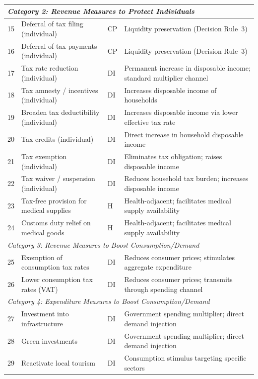 \documentclass[12pt]{article}
\begin{document}
\begin{small}
\begin{longtable}{p{0.6cm} p{5.8cm} p{1.2cm} p{5.5cm}}
\multicolumn{4}{l}{\textit{Category 2: Revenue Measures to Protect Individuals}} \\
\midrule
15 & Deferral of tax filing (individual) & CP & Liquidity preservation (Decision Rule~3) \\
16 & Deferral of tax payments (individual) & CP & Liquidity preservation (Decision Rule~3) \\
17 & Tax rate reduction (individual) & DI & Permanent increase in disposable income; standard multiplier channel \\
18 & Tax amnesty / incentives (individual) & DI & Increases disposable income of households \\
19 & Broaden tax deductibility (individual) & DI & Increases disposable income via lower effective tax rate \\
20 & Tax credits (individual) & DI & Direct increase in household disposable income \\
21 & Tax exemption (individual) & DI & Eliminates tax obligation; raises disposable income \\
22 & Tax waiver / suspension (individual) & DI & Reduces household tax burden; increases disposable income \\
23 & Tax-free provision for medical supplies & H & Health-adjacent; facilitates medical supply availability \\
24 & Customs duty relief on medical goods & H & Health-adjacent; facilitates medical supply availability \\
\midrule

\multicolumn{4}{l}{\textit{Category 3: Revenue Measures to Boost Consumption/Demand}} \\
\midrule
25 & Exemption of consumption tax rates & DI & Reduces consumer prices; stimulates aggregate expenditure \\
26 & Lower consumption tax rates (VAT) & DI & Reduces consumer prices; transmits through spending channel \\
\midrule

\multicolumn{4}{l}{\textit{Category 4: Expenditure Measures to Boost Consumption/Demand}} \\
\midrule
27 & Investment into infrastructure & DI & Government spending multiplier; direct demand injection \\
28 & Green investments & DI & Government spending multiplier; direct demand injection \\
29 & Reactivate local tourism & DI & Consumption stimulus targeting specific sectors \\
\midrule


\end{longtable}
\end{small}
\end{document}
